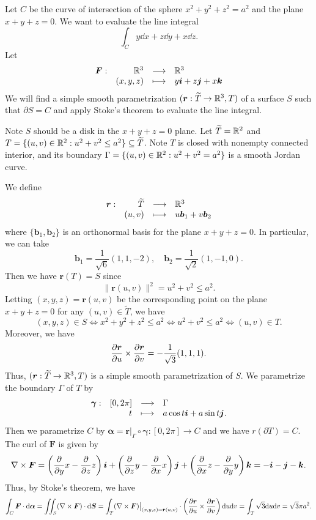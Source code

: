 \begin{exampleenv}
    Let $C$ be the curve of intersection of the sphere $x^2 + y^2 + z^2 = a^2$ and the plane $x+y+z=0$. We want to evaluate the line integral
    $$ \int_C y\dd x + z\dd y + x\dd z. $$
    Let
    $$ \begin{array}{r r c l}
        \bm F:& \mathbb{R}^3 & \longrightarrow & \mathbb{R}^3\\
        & (x,y,z) & \longmapsto & y\bm i + z\bm j + x\bm k
    \end{array}
    $$
    We will find a simple smooth parametrization $(\bm r: \widetilde T\to \mathbb{R}^3, T)$ of a surface $S$ such that $\partial S = C$ and apply Stoke's theorem to evaluate the line integral. 

    Note $S$ should be a disk in the $x+y+z=0$ plane. Let $\widetilde T = \mathbb{R}^2$ and $T = \{(u,v)\in \mathbb{R}^2: u^2 + v^2 \le a^2\} \subseteq \widetilde{T}$. Note $T$ is closed with nonempty connected interior, and its boundary $\Gamma = \{(u,v)\in \mathbb{R}^2: u^2 + v^2 = a^2\}$ is a smooth Jordan curve.

    We define
    $$ \begin{array}{r r c l}
        \bm r:& \widetilde T & \longrightarrow & \mathbb{R}^3\\
        & (u,v) & \longmapsto & u\bm b_1 + v\bm b_2
    \end{array} $$
    where $\{ \bm b_1, \bm b_2\}$ is an orthonormal basis for the plane $x+y+z=0$. In particular, we can take
    $$ \bm b_1 = \frac{1}{\sqrt{6}}(1,1,-2), \quad \bm b_2 = \frac{1}{\sqrt{2}}(1,-1,0). $$
    Then we have $\bm r(T) = S$ since
    $$
    \| \bm r(u,v) \| ^2 = u^2 + v^2 \le a^2.
    $$
    Letting $(x,y,z) = \bm r(u,v)$ be the corresponding point on the plane $x+y+z=0$ for any $(u,v)\in \widetilde T$, we have
    $$ (x,y,z) \in S \Leftrightarrow x^2+y^2+z^2 \le a^2 \Leftrightarrow u^2 + v^2 \le a^2 \Leftrightarrow (u,v) \in T. $$
    Moreover, we have
    $$
    \pdv{\bm r}{u} \times \pdv{\bm r}{v} = -\frac{1}{\sqrt{3}}(1,1,1).
    $$
    Thus, $(\bm r: \widetilde T\to \mathbb{R}^3, T)$ is a simple smooth parametrization of $S$. We parametrize the boundary $\Gamma$ of $T$ by
    $$ \begin{array}{r r c l}
        \bm \gamma:& [0,2\pi] & \longrightarrow & \Gamma\\
        & t & \longmapsto & a\cos t \bm i + a\sin t \bm j.
    \end{array} $$
    Then we parametrize $C$ by $\bm \alpha = \bm r\big|_\Gamma \circ \bm \gamma: [0,2\pi] \to C$ and we have $r(\partial T)=C.$
    The curl of $\bm F$ is given by
    $$ \nabla\times \bm F = \left( \pdv{y} x - \pdv{z} z \right)\bm i + \left( \pdv{z} y - \pdv{x} x \right)\bm j + \left( \pdv{x} z - \pdv{y} y \right)\bm k = -\bm i - \bm j - \bm k. $$
    Thus, by Stoke's theorem, we have
    $$
    \int_C \bm F \cdot \dd \bm \alpha = \iint_S (\nabla\times \bm F) \cdot \dd \bm S = \int_T (\nabla\times \bm F) \big|_{(x,y,z)=\bm r(u,v)} \cdot \left( \pdv{\bm r}{u} \times \pdv{\bm r}{v} \right) \dd u \dd v = \int_T \sqrt3 \dd u \dd v = \sqrt3 \pi a^2.
    $$
\end{exampleenv}

